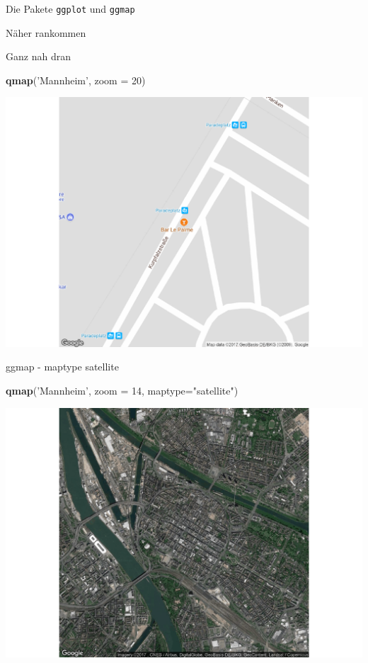 \documentclass[ignorenonframetext,]{beamer}
\newenvironment{Shaded}{}{}
\newcommand{\KeywordTok}[1]{\textcolor[rgb]{0.00,0.44,0.13}{\textbf{{#1}}}}
\newcommand{\DataTypeTok}[1]{\textcolor[rgb]{0.56,0.13,0.00}{{#1}}}
\newcommand{\DecValTok}[1]{\textcolor[rgb]{0.25,0.63,0.44}{{#1}}}
\newcommand{\StringTok}[1]{\textcolor[rgb]{0.25,0.44,0.63}{{#1}}}
\newcommand{\NormalTok}[1]{{#1}}
\begin{document}
\begin{frame}[fragile]{Die Pakete \texttt{ggplot} und \texttt{ggmap}}
\begin{block}{Näher rankommen}
\end{block}

\begin{block}{Ganz nah dran}

\begin{Shaded}
\begin{Highlighting}[]
\KeywordTok{qmap}\NormalTok{(}\StringTok{'Mannheim'}\NormalTok{, }\DataTypeTok{zoom =} \DecValTok{20}\NormalTok{)}
\end{Highlighting}
\end{Shaded}

\includegraphics{R_intern_files/figure-beamer/unnamed-chunk-261-1.pdf}

\end{block}

\begin{block}{ggmap - maptype satellite}

\begin{Shaded}
\begin{Highlighting}[]
\KeywordTok{qmap}\NormalTok{(}\StringTok{'Mannheim'}\NormalTok{, }\DataTypeTok{zoom =} \DecValTok{14}\NormalTok{, }\DataTypeTok{maptype=}\StringTok{"satellite"}\NormalTok{)}
\end{Highlighting}
\end{Shaded}

\includegraphics{R_intern_files/figure-beamer/unnamed-chunk-262-1.pdf}


\end{block}
\end{frame}
\end{document}

